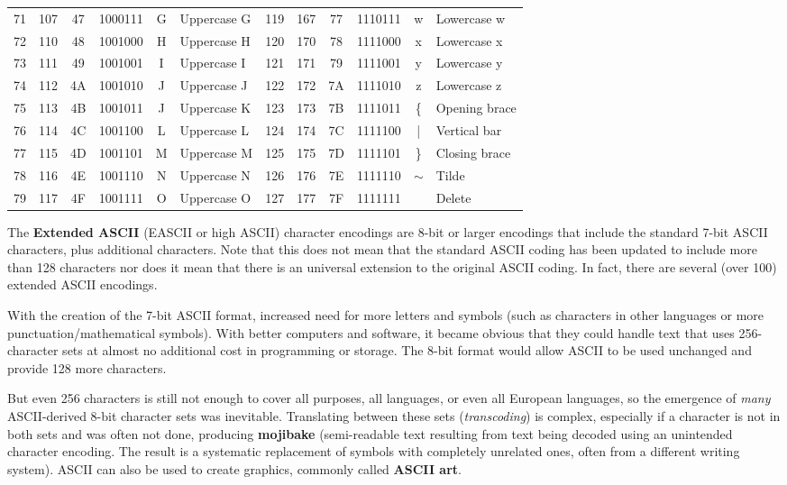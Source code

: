 \begin{definition}[ASCII]
{\begin{tabular}{ |c|c|c|c|c|l|c|c|c|c|c|l| }
        71 & 107 & 47& 1000111 &G&Uppercase G & 119 & 167 & 77& 1110111 &w&Lowercase w\\
        72 & 110 & 48& 1001000 &H&Uppercase H & 120 & 170 & 78& 1111000 &x&Lowercase x\\
        73 & 111 & 49& 1001001 &I&Uppercase I & 121 & 171 & 79& 1111001 &y&Lowercase y\\
        74 & 112 & 4A& 1001010 &J&Uppercase J & 122 & 172 & 7A& 1111010 &z&Lowercase z\\
        75 & 113 & 4B& 1001011 &J&Uppercase K & 123 & 173 & 7B& 1111011 &\{& Opening brace\\
        76 & 114 & 4C& 1001100 &L&Uppercase L & 124 & 174 & 7C& 1111100 &|& Vertical bar\\
        77 & 115 & 4D& 1001101 &M&Uppercase M & 125 & 175 & 7D& 1111101 &\}& Closing brace\\
        78 & 116 & 4E& 1001110 &N&Uppercase N & 126 & 176 & 7E& 1111110 & $\sim$ & Tilde\\
        79 & 117 & 4F& 1001111 &O&Uppercase O & 127 & 177 & 7F& 1111111 & & Delete\\
        \hline
      \end{tabular}}
    \end{definition}

    The \textbf{Extended ASCII} (EASCII or high ASCII) character encodings are 8-bit or larger encodings that include the standard 7-bit ASCII characters, plus additional characters. Note that this does not mean that the standard ASCII coding has been updated to include more than 128 characters nor does it mean that there is an universal extension to the original ASCII coding. In fact, there are several (over 100) extended ASCII encodings. 

    With the creation of the 7-bit ASCII format, increased need for more letters and symbols (such as characters in other languages or more punctuation/mathematical symbols). With better computers and software, it became obvious that they could handle text that uses 256-character sets at almost no additional cost in programming or storage. The 8-bit format would allow ASCII to be used unchanged and provide 128 more characters. 

    But even 256 characters is still not enough to cover all purposes, all languages, or even all European languages, so the emergence of \textit{many} ASCII-derived 8-bit character sets was inevitable. Translating between these sets (\textit{transcoding}) is complex, especially if a character is not in both sets and was often not done, producing \textbf{mojibake} (semi-readable text resulting from text being decoded using an unintended character encoding. The result is a systematic replacement of symbols with completely unrelated ones, often from a different writing system). ASCII can also be used to create graphics, commonly called \textbf{ASCII art}. 

